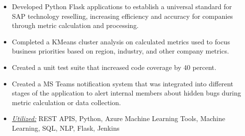 \documentclass[10pt,a4paper,ragged2e]{altacv}
\begin{document}

\begin{fullwidth}
\makecvheader
\end{fullwidth}




\begin{itemize}
\item Developed Python Flask applications to establish a universal standard for SAP technology reselling, increasing efficiency and accuracy for companies through metric calculation and processing.
\item Completed a KMeans cluster analysis on calculated metrics used to focus business priorities based on region, industry, and other company metrics.
\item Created a unit test suite that increased code coverage by 40 percent.
\item Created a MS Teams notification system that was integrated into different stages of the application to alert internal members about hidden bugs during metric calculation or data collection.
\item \underline{\textit{Utilized:}} REST APIS, Python, Azure Machine Learning Tools, Machine Learning, SQL, NLP, Flask, Jenkins
\end{itemize}
\divider\small
\end{document}
